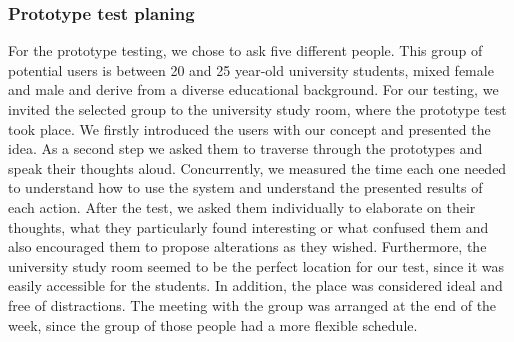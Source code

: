 \subsubsection{Prototype test planing}
\label{s_6}

For the prototype testing, we chose to ask five different people. This group of 
potential users is between 20 and 25 year-old university students, mixed female 
and male and derive from a diverse educational background. 
For our testing, we invited the selected group to the university study room, 
where the prototype test took place. We firstly introduced the users with our 
concept and presented the idea. As a second step we asked them to traverse 
through the prototypes and speak their thoughts aloud. Concurrently, we measured 
the time each one needed to understand how to use the system and understand the 
presented results of each action. After the test, we asked them individually to 
elaborate on their thoughts, what they particularly found interesting or what 
confused them and also encouraged them to propose alterations as they wished. 
Furthermore, the university study room seemed to be the perfect location for our 
test, since it was easily accessible for the students. In addition, the place 
was considered ideal and free of distractions. 
The meeting with the group was arranged at the end of the week, since the group 
of those people had a more flexible schedule.


